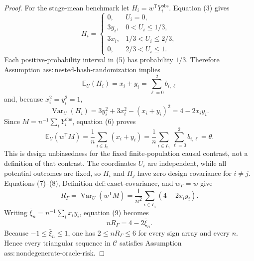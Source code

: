 \documentclass{article}
\begin{document}
\begin{proof}
For the stage-mean benchmark let \(H_i=w^{\mathsf T}Y_i^{\mathrm{obs}}\).  Equation (3) gives
\[
H_i=
\begin{cases}
0,&U_i=0,\\
3y_i,&0<U_i\le1/3,\\
3x_i,&1/3<U_i\le2/3,\\
0,&2/3<U_i\le1.
\end{cases}
\tag{5}
\]
Each positive-probability interval in (5) has probability \(1/3\).  Therefore Assumption \(\mathrm{ass:nested\text{-}hash\text{-}randomization}\) implies
\[
\mathbb E_U(H_i)=x_i+y_i=\sum_{\ell=0}^2b_{i,\ell}
\tag{6}
\]
and, because \(x_i^2=y_i^2=1\),
\[
\operatorname{Var}_U(H_i)
=3y_i^2+3x_i^2-(x_i+y_i)^2
=4-2x_i y_i.
\tag{7}
\]
Since \(M=n^{-1}\sum_iY_i^{\mathrm{obs}}\), equation (6) proves
\[
\mathbb E_U(w^{\mathsf T}M)
=\frac1n\sum_{i\in I_n}(x_i+y_i)
=\frac1n\sum_{i\in I_n}\sum_{\ell=0}^2b_{i,\ell}
=\theta.
\tag{8}
\]
This is design unbiasedness for the fixed finite-population causal contrast, not a definition of that contrast.  The coordinates \(U_i\) are independent, while all potential outcomes are fixed, so \(H_i\) and \(H_j\) have zero design covariance for \(i\ne j\).  Equations (7)--(8), Definition \(\mathrm{def:exact\text{-}covariance}\), and \(w_\Gamma=w\) give
\[
R_\Gamma
=\operatorname{Var}_U(w^{\mathsf T}M)
=\frac1{n^2}\sum_{i\in I_n}(4-2x_i y_i).
\tag{9}
\]
Writing \(\bar\xi_n=n^{-1}\sum_i x_i y_i\), equation (9) becomes
\[
nR_\Gamma=4-2\bar\xi_n.
\tag{10}
\]
Because \(-1\le\bar\xi_n\le1\), one has \(2\le nR_\Gamma\le6\) for every sign array and every \(n\).  Hence every triangular sequence in \(\mathcal C\) satisfies Assumption \(\mathrm{ass:nondegenerate\text{-}oracle\text{-}risk}\).


\end{proof}
\end{document}
